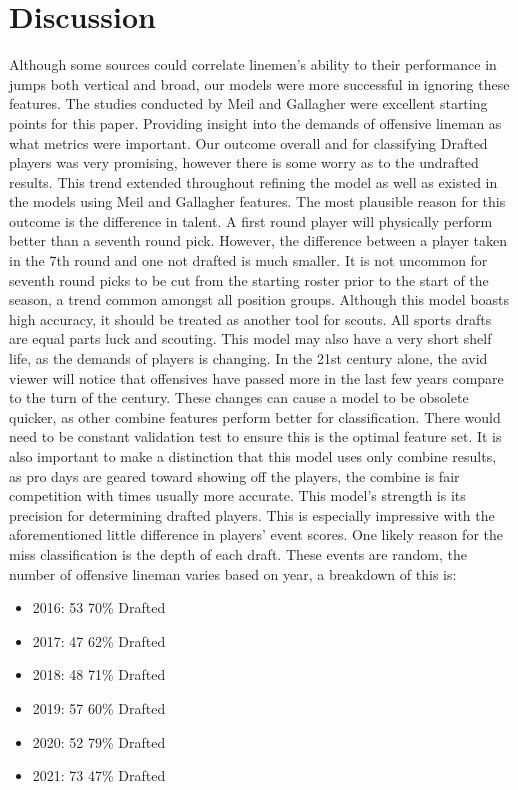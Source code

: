 \documentclass[confrence]{IEEEtran}
\begin{document}
\section*{Discussion}
Although some sources could correlate linemen's ability to their performance in jumps both vertical and broad, our models were more successful in ignoring these features.
The studies conducted by Meil and Gallagher were excellent starting points for this paper. Providing insight into the demands of offensive lineman as what metrics were important.
Our outcome overall and for classifying Drafted players was very promising, however there is some worry as to the undrafted results.
This trend extended throughout refining the model as well as existed in the models using Meil and Gallagher features.
The most plausible reason for this outcome is the difference in talent. A first round player will physically perform better than a seventh round pick. However, the difference between a player taken in the 7th round and one not drafted is much smaller.
It is not uncommon for seventh round picks to be cut from the starting roster prior to the start of the season, a trend common amongst all position groups.
Although this model boasts high accuracy, it should be treated as another tool for scouts. All sports drafts are equal parts luck and scouting.
This model may also have a very short shelf life, as the demands of players is changing. In the 21st century alone, the avid viewer will notice that offensives have passed more in the last few years compare to the turn of the century.
These changes can cause a model to be obsolete quicker, as other combine features perform better for classification.
There would need to be constant validation test to ensure this is the optimal feature set.
It is also important to make a distinction that this model uses only combine results, as pro days are geared toward showing off the players, the combine is fair competition with times usually more accurate.
This model's strength is its precision for determining drafted players. This is especially impressive with the aforementioned little difference in players' event scores.
One likely reason for the miss classification is the depth of each draft. These events are random, the number of offensive lineman varies based on year, a breakdown of this is:
\begin{itemize}
\item 2016: 53 70\% Drafted
\item 2017: 47 62\% Drafted
\item 2018: 48 71\% Drafted
\item 2019: 57 60\% Drafted
\item 2020: 52 79\% Drafted
\item 2021: 73 47\% Drafted
\end{itemize}
\end{document}
